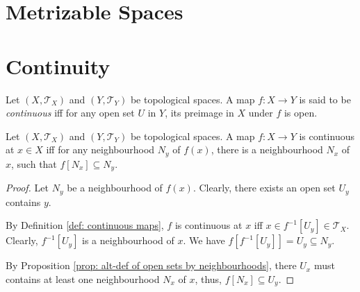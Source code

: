 \section{Metrizable Spaces}


\section{Continuity}


\begin{definition}
	\label{def: continuous maps}
	Let $(X, \mathcal T_X)$ and $(Y, \mathcal T_Y)$ be topological spaces. A map $f: X \to Y$ is said to be \textit{continuous} iff for any open set $U$ in $Y$, its preimage in $X$ under $f$ is open.
\end{definition}


\begin{proposition}
	\label{prop: alt-def of continuous maps by neighbourhoods}
	Let $(X, \mathcal T_X)$ and $(Y, \mathcal T_Y)$ be topological spaces. A map $f: X \to Y$ is continuous at $x \in X$ iff for any neighbourhood $N_y$ of $f(x)$, there is a neighbourhood $N_x$ of $x$, such that $f[N_x] \subseteq N_y$.
	
	\begin{proof}
		Let $N_y$ be a neighbourhood of $f(x)$. Clearly, there exists an open set $U_y$ contains $y$.
	
		By Definition \ref{def: continuous maps}, $f$ is continuous at $x$ iff $x \in f^{-1}[U_y] \in \mathcal T_X$. Clearly, $f^{-1}[U_y]$ is a neighbourhood of $x$. We have $f[f^{-1}[U_y]] = U_y \subseteq N_y$.
		
		By Proposition \ref{prop: alt-def of open sets by neighbourhoods}, there $U_x$ must contains at least one neighbourhood $N_x$ of $x$, thus, $f[N_x] \subseteq U_y$.
	\end{proof}
\end{proposition}


